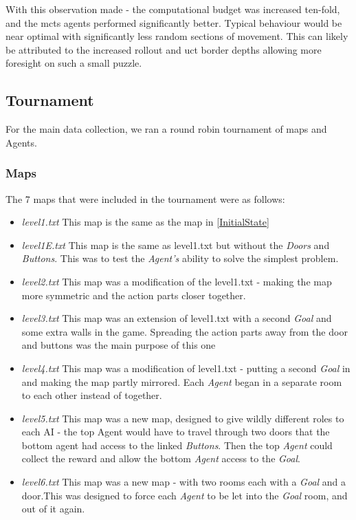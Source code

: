 \documentclass{IEEEtran}
\begin{document}
With this observation made - the computational budget was increased ten-fold, and the \gls{mcts} agents performed significantly better. Typical behaviour would be near optimal with significantly less random sections of movement. This can likely be attributed to the increased rollout and \gls{uct} border depths allowing more foresight on such a small puzzle.
\subsection{Tournament}
For the main data collection, we ran a round robin tournament of maps and Agents.

\subsubsection{Maps}
The 7 maps that were included in the tournament were as follows:
\begin{itemize}
\item{\emph{level1.txt} This map is the same as the map in \ref{InitialState}}
\item{\emph{level1E.txt} This map is the same as level1.txt but without the \emph{Doors} and \emph{Buttons}. This was to test the \emph{Agent's} ability to solve the simplest problem.}
\item{\emph{level2.txt} This map was a modification of the level1.txt - making the map more symmetric and the action parts closer together.}
\item{\emph{level3.txt} This map was an extension of level1.txt with a second \emph{Goal} and some extra walls in the game. Spreading the action parts away from the door and buttons was the main purpose of this one}
\item{\emph{level4.txt} This map was a modification of level1.txt - putting a second \emph{Goal} in and making the map partly mirrored. Each \emph{Agent} began in a separate room to each other instead of together.}
\item{\emph{level5.txt} This map was a new map, designed to give wildly different roles to each AI - the top Agent would have to travel through two doors that the bottom agent had access to the linked \emph{Buttons}. Then the top \emph{Agent} could collect the reward and allow the bottom \emph{Agent} access to the \emph{Goal}.}
\item{\emph{level6.txt} This map was a new map - with two rooms each with a \emph{Goal} and a door.This was designed to force each \emph{Agent} to be let into the \emph{Goal} room, and out of it again.}
\end{itemize}
\end{document}
